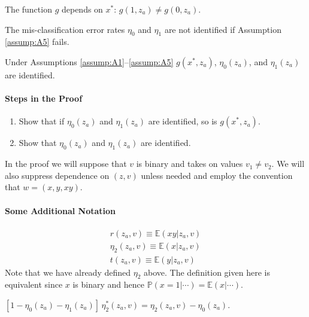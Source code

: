 \documentclass[12pt]{article}
\begin{document}
\begin{assump}[Relevance of $x^*$] The function $g$ depends on $x^*$:  $g(1,z_a) \neq g(0,z_a)$. 
  \label{assump:A5}
\end{assump}
The mis-classification error rates $\eta_0$ and $\eta_1$ are not identified if Assumption \ref{assump:A5} fails. 

\begin{thm}
  Under Assumptions \ref{assump:A1}--\ref{assump:A5} $g(x^*,z_a)$,  $\eta_0(z_a)$, and $\eta_1(z_a)$ are identified.
  \label{thm:mahajan}
\end{thm}
  
\paragraph{Steps in the Proof}
\begin{enumerate}
  \item Show that if $\eta_0(z_a)$ and $\eta_1(z_a)$ are identified, so is $g(x^*,z_a)$.
  \item Show that $\eta_0(z_a)$ and $\eta_1(z_a)$ are identified.
\end{enumerate}
In the proof we will suppose that $v$ is binary and takes on values $v_1\neq v_2$.
We will also suppress dependence on $(z,v)$ unless needed and employ the convention that $w = (x, y, xy)$.

\paragraph{Some Additional Notation}
  \begin{align*}
    r(z_a,v) \equiv \mathbb{E}(xy|z_a,v)\\
    \eta_2(z_a,v) \equiv \mathbb{E}(x|z_a,v)\\
    t(z_a,v) \equiv \mathbb{E}(y|z_a,v)
  \end{align*}
Note that we have already defined $\eta_2$ above. 
The definition given here is equivalent since $x$ is binary and hence $\mathbb{P}(x=1|\cdots) = \mathbb{E}(x|\cdots)$.

\begin{lem}
  $[1 - \eta_0(z_a) - \eta_1(z_a)]\, \eta^*_2(z_a,v) = \eta_2(z_a,v) - \eta_0(z_a)$.
  \label{lem:star_nonstar}
\end{lem}
\end{document}
